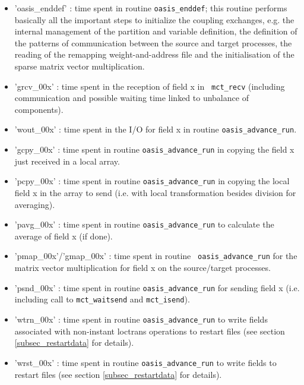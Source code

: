 \begin{itemize}
\item {'oasis\_enddef'} : time spent in 
  routine {\tt oasis\_enddef}; this routine performs basically all the
  important steps to initialize the coupling exchanges, e.g. the
  internal management of the partition and variable definition, the
  definition of the patterns of communication between the source and
  target processes, the reading of the remapping weight-and-address
  file and the initialisation of the sparse matrix vector multiplication.
\item {'grcv\_00x'} : time spent in the reception of field x in {\tt
    mct\_recv} (including communication and possible waiting time
  linked to unbalance of components).
\item {'wout\_00x'} : time spent in the I/O for field x in routine
  {\tt oasis\_advance\_run}.
\item {'gcpy\_00x'} : time spent in routine {\tt oasis\_advance\_run}
  in copying the field x just received in a local array.
\item {'pcpy\_00x'} : time spent in routine {\tt oasis\_advance\_run}
  in copying the local field x in the array to send (i.e. with local
  transformation besides division for averaging).
\item {'pavg\_00x'} : time spent in routine {\tt oasis\_advance\_run}
  to calculate the average of field x (if done).
\item {'pmap\_00x'/'gmap\_00x'} : time spent in routine {\tt
    oasis\_advance\_run} for the matrix vector multiplication for
  field x on the source/target processes.
\item {'psnd\_00x'} : time spent in routine {\tt oasis\_advance\_run}
  for sending field x (i.e. including call to {\tt mct\_waitsend} and
  {\tt mct\_isend}).
\item {'wtrn\_00x'} : time spent in routine {\tt oasis\_advance\_run}
  to write fields associated with non-instant loctrans operations to
  restart files  (see section \ref{subsec_restartdata} for details).
\item {'wrst\_00x'} : time spent in routine {\tt oasis\_advance\_run}
  to write fields to
  restart files (see section \ref{subsec_restartdata} for details).
\end{itemize}

